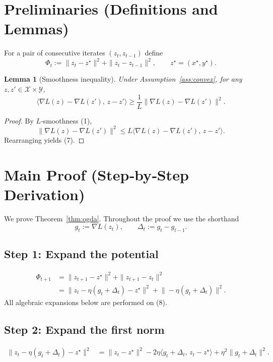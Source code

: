 \documentclass{article}
\newtheorem{lemma}{Lemma}
\begin{document}
\newpage
\section*{Preliminaries (Definitions and Lemmas)}
\begin{definition}
For a pair of consecutive iterates $(z_{t},z_{t-1})$ define
\[
\Phi_{t}:=\|z_{t}-z^{\star}\|^{2}+ \|z_{t}-z_{t-1}\|^{2},
\qquad z^{\star}=(x^{\star},y^{\star}).
\tag{6}
\]
\end{definition}

\begin{lemma}[Smoothness inequality]\label{lem:smooth}
Under Assumption~\ref{ass:convex}, for any $z,z'\in\mathcal{X}\times\mathcal{Y}$,
\[
\langle \nabla L(z)-\nabla L(z'),\,z-z'\rangle\ge
\frac{1}{L}\|\nabla L(z)-\nabla L(z')\|^{2}.
\tag{7}
\]
\end{lemma}
\begin{proof}
By $L$‑smoothness (1),
\[
\|\nabla L(z)-\nabla L(z')\|^{2}\le L\langle \nabla L(z)-\nabla L(z'),\,z-z'\rangle.
\]
Rearranging yields (7). \qedhere
\end{proof}

\section*{Main Proof (Step‑by‑Step Derivation)}
We prove Theorem~\ref{thm:ogda}. Throughout the proof we use the shorthand
\[
g_{t}:=\nabla L(z_{t}),\qquad \Delta_{t}:=g_{t}-g_{t-1}.
\]

\subsection*{Step 1: Expand the potential}
\begin{align}
\Phi_{t+1}
&= \|z_{t+1}-z^{\star}\|^{2}+ \|z_{t+1}-z_{t}\|^{2}\nonumber\\
&= \bigl\|z_{t}-\eta(g_{t}+\Delta_{t})-z^{\star}\bigr\|^{2}
   +\bigl\|\!-\eta(g_{t}+\Delta_{t})\bigr\|^{2}.\tag{8}
\end{align}
All algebraic expansions below are performed on (8).

\subsection*{Step 2: Expand the first norm}
\begin{align}
\|z_{t}-\eta(g_{t}+\Delta_{t})-z^{\star}\|^{2}
&=\|z_{t}-z^{\star}\|^{2}
   -2\eta\langle g_{t}+\Delta_{t},\,z_{t}-z^{\star}\rangle
   +\eta^{2}\|g_{t}+\Delta_{t}\|^{2}. \tag{9}
\end{align}
\end{document}
